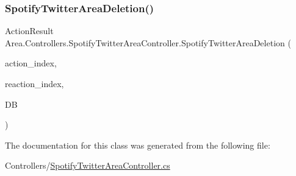 \mbox{\label{classArea_1_1Controllers_1_1SpotifyTwitterAreaController_aff0e59e5467fe8a565b32fec49fee16d}} 
\subsubsection{\texorpdfstring{Spotify\+Twitter\+Area\+Deletion()}{SpotifyTwitterAreaDeletion()}}
{\footnotesize\ttfamily Action\+Result Area.\+Controllers.\+Spotify\+Twitter\+Area\+Controller.\+Spotify\+Twitter\+Area\+Deletion (\begin{DoxyParamCaption}\item[{string}]{action\+\_\+index,  }\item[{string}]{reaction\+\_\+index,  }\item[{\mbox{[}\+From\+Services\mbox{]} \mbox{\hyperlink{classArea_1_1DAT_1_1AreaDbContext}{Area\+Db\+Context}}}]{DB }\end{DoxyParamCaption})\hspace{0.3cm}{\ttfamily [inline]}}



The documentation for this class was generated from the following file\+:\begin{DoxyCompactItemize}
\item 
Controllers/\mbox{\hyperlink{SpotifyTwitterAreaController_8cs}{Spotify\+Twitter\+Area\+Controller.\+cs}}\end{DoxyCompactItemize}
